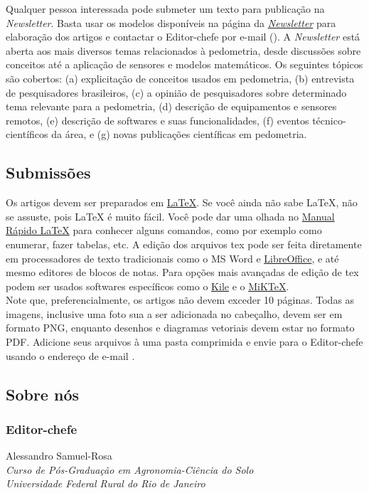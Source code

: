 \noindent Qualquer pessoa interessada pode submeter um texto para publicação na \textit{Newsletter}. Basta usar os modelos disponíveis na página da \href{https://sites.google.com/site/pedometria/file-cabinet}{\textit{Newsletter}} para elaboração dos artigos e contactar o Editor-chefe por e-mail (). A \textit{Newsletter} está aberta aos mais diversos temas relacionados à pedometria, desde discussões sobre conceitos até a aplicação de sensores e modelos matemáticos. Os seguintes tópicos são cobertos: (a) explicitação de conceitos usados em pedometria, (b) entrevista de pesquisadores brasileiros, (c) a opinião de pesquisadores sobre determinado tema relevante para a pedometria, (d) descrição de equipamentos e sensores remotos, (e) descrição de softwares e suas funcionalidades, (f) eventos técnico-científicos da área, e (g) novas publicações científicas em pedometria.
\subsection{Submissões}
Os artigos devem ser preparados em \href{http://www.latex-project.org/}{LaTeX}. Se você ainda não sabe LaTeX, não se assuste, pois LaTeX é muito fácil. Você pode dar uma olhada no \href{http://www.stdout.org/~winston/latex/}{Manual Rápido LaTeX} para conhecer alguns comandos, como por exemplo como enumerar, fazer tabelas, etc. A edição dos arquivos tex pode ser feita diretamente em processadores de texto tradicionais como o MS Word e \href{http://www.libreoffice.org/}{LibreOffice}, e até mesmo editores de blocos de notas. Para opções mais avançadas de edição de tex podem ser usados softwares específicos como o \href{http://kile.sourceforge.net/}{Kile} e o \href{http://miktex.org/}{MiKTeX}.\\
Note que, preferencialmente, os artigos não devem exceder 10 páginas. Todas as imagens, inclusive uma foto sua a ser adicionada no cabeçalho, devem ser em formato PNG, enquanto desenhos e diagramas vetoriais devem estar no formato PDF. Adicione seus arquivos à uma pasta comprimida e envie para o Editor-chefe usando o endereço de e-mail .
\subsection{Sobre nós}
\subsubsection{Editor-chefe}
Alessandro Samuel-Rosa\\
\textit{Curso de Pós-Graduação em Agronomia-Ciência do Solo}\\
\textit{Universidade Federal Rural do Rio de Janeiro}\\

